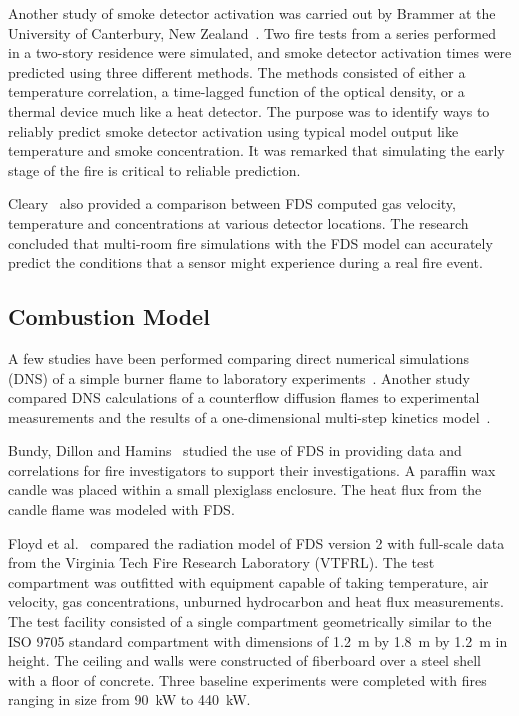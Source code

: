 Another study of smoke detector activation was carried out by Brammer at the University of Canterbury, New Zealand~\cite{Brammer:1}. Two fire tests from a series performed in a two-story residence were simulated, and smoke detector activation times were predicted using three different methods. The methods consisted of either a temperature correlation, a time-lagged function of the optical density, or a thermal device much like a heat detector. The purpose was to identify ways to reliably predict smoke detector activation using typical model output like temperature and smoke concentration. It was remarked that simulating the early stage of the fire is critical to reliable prediction.

Cleary~\cite{Cleary:1} also provided a comparison between FDS computed gas velocity, temperature and concentrations at various detector locations.  The research concluded that multi-room fire simulations with the FDS model can accurately predict the conditions that a sensor might experience during a real fire event.




\subsection{Combustion Model}

A few studies have been performed comparing direct numerical simulations (DNS) of a simple burner flame to laboratory experiments~\cite{Mukhopadhyay:1}. Another study compared DNS calculations of a counterflow diffusion flames to experimental measurements and the results of a one-dimensional multi-step kinetics model~\cite{Hamins:NASA}.

Bundy, Dillon and Hamins~\cite{Dillon:1,Hamins:FPE2005} studied the use of FDS in providing data and correlations for fire investigators to support their investigations.  A paraffin wax candle was placed within a small plexiglass enclosure. The heat flux from the candle flame was modeled with FDS.

Floyd et al.~\cite{Floyd:1,Floyd:6} compared the radiation model of FDS version 2 with full-scale data from the Virginia Tech Fire Research Laboratory (VTFRL). The test compartment was outfitted with equipment capable  of taking  temperature,  air velocity,  gas concentrations, unburned hydrocarbon and heat flux measurements. The test facility consisted of a single compartment geometrically similar to the ISO 9705 standard compartment with dimensions of 1.2~m by 1.8~m by 1.2~m in height.  The ceiling and walls were constructed of fiberboard over a steel shell with a floor of concrete.  Three baseline experiments were completed with fires ranging in size from 90~kW to 440~kW.

